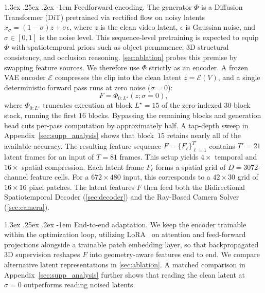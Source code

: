 \documentclass[10pt,twocolumn,letterpaper]{article}
\makeatletter
\renewcommand\paragraph{\@startsection{paragraph}{4}{\z@}%
  {1.3ex \@plus .25ex \@minus .2ex}%
  {-1em}%
  {\normalfont\normalsize\bfseries}}
\makeatother
\begin{document}
\paragraph{Feedforward encoding.}
The generator $\Phi$ is a Diffusion Transformer (DiT) pretrained via rectified flow on noisy latents $x_\sigma = (1{-}\sigma)z + \sigma\epsilon$, where $z$ is the clean video latent, $\epsilon$ is Gaussian noise, and $\sigma\in[0,1]$ is the noise level. This sequence-level pretraining is expected to equip $\Phi$ with spatiotemporal priors such as object permanence, 3D structural consistency, and occlusion reasoning. \cref{sec:ablation} probes this premise by swapping feature sources. We therefore use $\Phi$ strictly as an encoder. A frozen VAE encoder $\mathcal{E}$ compresses the clip into the clean latent $z=\mathcal{E}(V)$, and a single deterministic forward pass runs at zero noise ($\sigma=0$):
\begin{equation}
F = \Phi_{0:L^\star}(z; \sigma=0),
\label{eq:encoder}
\end{equation}
where $\Phi_{0:L^\star}$ truncates execution at block $L^\star=15$ of the zero-indexed $30$-block stack, running the first $16$ blocks. Bypassing the remaining blocks and generation head cuts per-pass computation by approximately half. A tap-depth sweep in Appendix~\ref{sec:supp_analysis} shows that block~$15$ retains nearly all of the available accuracy.
The resulting feature sequence $F=\{F_\ell\}_{\ell=1}^{T'}$ contains $T'=21$ latent frames for an input of $T=81$ frames. This setup yields $4\times$ temporal and $16\times$ spatial compression. Each latent frame $F_\ell$ forms a spatial grid of $D=3072$-channel feature cells. For a $672\times 480$ input, this corresponds to a $42\times 30$ grid of $16\times 16$ pixel patches.
The latent features $F$ then feed both the Bidirectional Spatiotemporal Decoder (\cref{sec:decoder}) and the Ray-Based Camera Solver (\cref{sec:camera}).

\paragraph{End-to-end adaptation.}
We keep the encoder trainable within the optimization loop, utilizing LoRA~\citep{lora2022} on attention and feed-forward projections alongside a trainable patch embedding layer, so that backpropagated 3D supervision reshapes $F$ into geometry-aware features end to end. We compare alternative latent representations in \cref{sec:ablation}. A matched comparison in Appendix~\ref{sec:supp_analysis} further shows that reading the clean latent at $\sigma=0$ outperforms reading noised latents.
\end{document}

